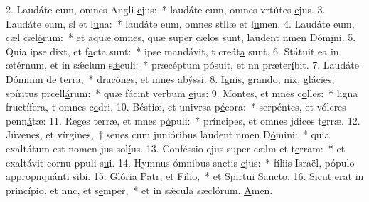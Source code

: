2. Laudáte eum, omnes Angli \uline{e}jus:~* laudáte eum, omnes vrtútes \uline{e}jus.
3. Laudáte eum, sl et l\uline{u}na:~* laudáte eum, omnes stllæ et l\uline{u}men.
4. Laudáte eum, cæl cæl\uline{ó}rum:~* et aquæ omnes, quæ super cælos sunt, laudent nmen Dóm\uline{i}ni.
5. Quia ipse dixt, et f\uline{a}cta sunt:~* ipse mandávit, t creát\uline{a} sunt.
6. Státuit ea in ætérnum, et in sǽclum s\uline{ǽ}culi:~* præcéptum pósuit, et nn præter\uline{í}bit.
7. Laudáte Dóminm de t\uline{e}rra,~* dracónes, et mnes ab\uline{ý}ssi.
8. Ignis, grando, nix, glácies, spíritus prcell\uline{á}rum:~* quæ fácint verbum \uline{e}jus:
9. Montes, et mnes c\uline{o}lles:~* ligna fructífera, t omnes c\uline{e}dri.
10. Béstiæ, et univrsa p\uline{é}cora:~* serpéntes, et vólcres penn\uline{á}tæ:
11. Reges terræ, et mnes p\uline{ó}puli:~* príncipes, et omnes jdices t\uline{e}rræ.
12. Júvenes, et vírgines,~† senes cum junióribus laudent nmen D\uline{ó}mini:~* quia exaltátum est nomen jus sol\uline{í}us.
13. Conféssio ejus super cælm et t\uline{e}rram:~* et exaltávit cornu ppuli s\uline{u}i.
14. Hymnus ómnibus snctis \uline{e}jus:~* fíliis Israël, pópulo appropnquánti s\uline{i}bi.
15. Glória Patr, et F\uline{í}lio,~* et Spirtui S\uline{a}ncto.
16. Sicut erat in princípio, et nnc, et s\uline{e}mper,~* et in sǽcula sæclórum. \uline{A}men.
